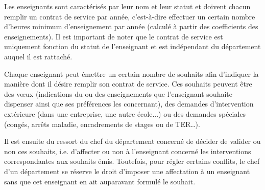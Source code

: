  Les enseignants sont caractérisés par leur nom et leur statut et doivent chacun remplir un contrat de service par année, c'est-à-dire effectuer un certain nombre d'heures minimum d'enseignement par année (calculé à partir des coefficients des enseignements). Il est important de noter que le contrat de service est uniquement fonction du statut de l'enseignant et est indépendant du département auquel il est rattaché.

 Chaque enseignant peut émettre un certain nombre de souhaits afin d'indiquer la manière dont il désire remplir son contrat de service. Ces souhaits peuvent être des vœux (indications du ou des enseignements que l'enseignant souhaite dispenser ainsi que ses préférences les concernant), des demandes d'intervention extérieure (dans une entreprise, une autre école...) ou des demandes spéciales (congés, arrêts maladie, encadrements de stages ou de TER\dots).

 Il est ensuite du ressort du chef du département concerné de décider de valider ou non ces souhaits, i.e. d'affecter ou non à l'enseignant concerné les interventions correspondantes aux souhaits émis. Toutefois, pour régler certains conflits, le chef d'un département se réserve le droit d'imposer une affectation à un enseignant sans que cet enseignant en ait auparavant formulé le souhait.



